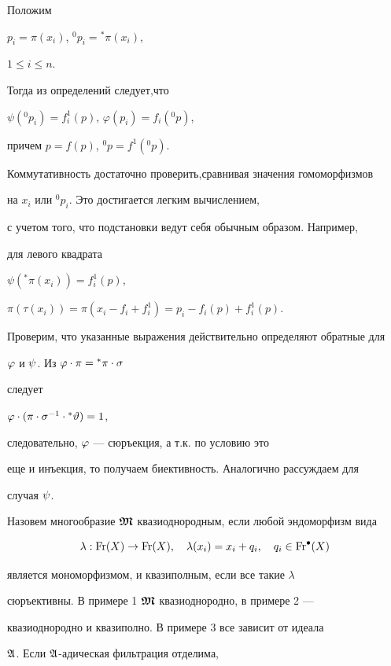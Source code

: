 \begin{pf} Положим


$p_i=\pi(x_i)$, ${}^0 p_i={}^{\ast}\pi(x_i)$,


$1\le i\le n$.


Тогда из определений следует,что


$\psi({}^0 p_i)=f^1_i(p)$, $ \varphi(p_i)=f_i({}^0 p)$,


причем $p=f(p)$, ${}^0 p= f^1({}^0 p)$.


Коммутативность достаточно проверить,сравнивая значения гомоморфизмов


на $x_i$ или ${}^0 p_i$. Это достигается легким вычислением,


с учетом того, что подстановки ведут себя обычным образом. Например,


для левого квадрата


$\psi({}^{\ast}\pi(x_i))=f^1_i(p)$,


$\pi(\tau(x_i))=\pi(x_i-f_i+f^1_i)= p_i-f_i(p)+f^1_i(p)$.


Проверим, что указанные выражения действительно определяют обратные для


$\varphi$ и $\psi$. Из $\varphi\cdot\pi={}^{\ast}\pi\cdot\sigma$


следует


$\varphi\cdot (\pi\cdot\sigma^{-1}\cdot{}^{\ast}\vartheta)=1$,


следовательно, $\varphi$ --- сюръекция, а т.к. по условию это


еще и инъекция, то получаем биективность. Аналогично рассуждаем для


случая $\psi$.


\end{pf}





Назовем многообразие $\boldsymbol{\frak M}$ квазиоднородным, если любой эндоморфизм вида


$$


\lambda : \Fr(X)\to \Fr(X),\quad


\lambda(x_i)=x_i+ q_i,\quad q_i \in \Fr^{\bullet}(X)


$$


является мономорфизмом, и квазиполным, если все такие $\lambda$


сюръективны. В примере 1 $\boldsymbol{\frak M}$ квазиоднородно, в примере 2 ---


квазиоднородно и квазиполно. В примере 3 все зависит от идеала


$\frak A$. Если $\frak A$-адическая фильтрация отделима,


